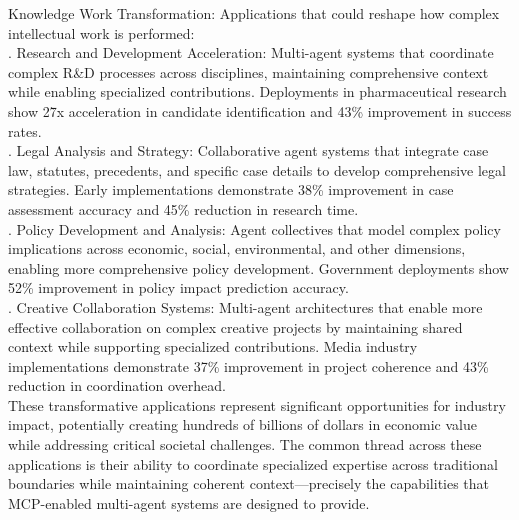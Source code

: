 Knowledge Work Transformation: Applications that could reshape how complex intellectual work is performed:\\ . Research and Development Acceleration: Multi-agent systems that coordinate complex R\&D processes across disciplines, maintaining comprehensive context while enabling specialized contributions. Deployments in pharmaceutical research show 2\.7x acceleration in candidate identification and 43\% improvement in success rates.\\ . Legal Analysis and Strategy: Collaborative agent systems that integrate case law, statutes, precedents, and specific case details to develop comprehensive legal strategies. Early implementations demonstrate 38\% improvement in case assessment accuracy and 45\% reduction in research time.\\ . Policy Development and Analysis: Agent collectives that model complex policy implications across economic, social, environmental, and other dimensions, enabling more comprehensive policy development. Government deployments show 52\% improvement in policy impact prediction accuracy.\\ . Creative Collaboration Systems: Multi-agent architectures that enable more effective collaboration on complex creative projects by maintaining shared context while supporting specialized contributions. Media industry implementations demonstrate 37\% improvement in project coherence and 43\% reduction in coordination overhead.\\ \newline
These transformative applications represent significant opportunities for industry impact, potentially creating hundreds of billions of dollars in economic value while addressing critical societal challenges. The common thread across these applications is their ability to coordinate specialized expertise across traditional boundaries while maintaining coherent context—precisely the capabilities that MCP-enabled multi-agent systems are designed to provide.\\
